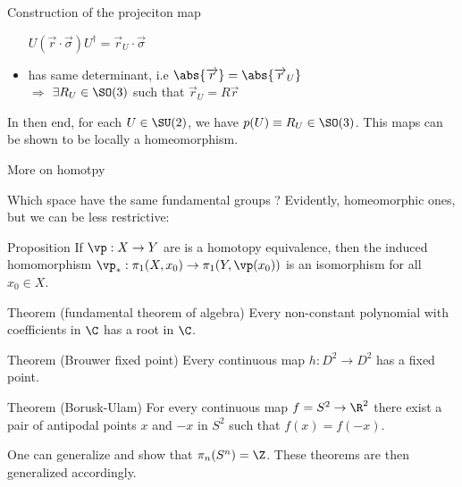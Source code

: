 \documentclass[9pt]{beamer}
\renewcommand{\emph}{\alert}
\begin{document}
\begin{frame}{Construction of the projeciton map}
\begin{itemize}
$U(\overrightarrow{r}\cdot \overrightarrow{\sigma})U^\dagger=\overrightarrow{r}_U\cdot \overrightarrow{\sigma}$
        \item has same determinant, i.e $\abs{\overrightarrow{r}}=\abs{\overrightarrow{r}_U}$\\
            $\Rightarrow$ $\exists R_U\in\SO(3)$ such that $\overrightarrow{r}_U=R\overrightarrow{r}$
    \end{itemize}
    In then end, for each $U\in\SU(2)$, we have $p(U)\equiv R_U\in\SO(3)$. This maps can be shown to be locally a \emph{homeomorphism}.
\end{frame}

\begin{frame}{More on homotpy}

    Which space have the same fundamental groups ? Evidently, homeomorphic ones, but we can be less restrictive:
    \begin{block}{Proposition}
        If $\vp:X\to Y$ are is a homotopy equivalence, then the induced homomorphism $\vp_*:\pi_1(X,x_0)\to\pi_1(Y,\vp(x_0))$ is an isomorphism for all $x_0\in X$.
    \end{block}
    \begin{block}{Theorem (fundamental theorem of algebra)}
        Every non-constant polynomial with coefficients in $\C$ has a root in $\C$.
    \end{block}
    \begin{block}{Theorem (Brouwer fixed point)}
        Every continuous map $h:D^2\to D^2$ has a fixed point.
    \end{block}
    \begin{block}{Theorem (Borusk-Ulam)}
        For every continuous map $f=S^2\to \R^2$ there exist a pair of antipodal points $x$ and $-x$ in $S^2$ such that $f(x)=f(-x)$.
    \end{block}

    One can generalize and show that $\pi_n(S^n)=\Z$. These theorems are then generalized accordingly.
    
\end{frame}
\end{document}
